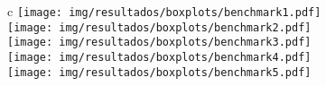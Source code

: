\begin{longfigure}{c}
	\texttt{[image: img/resultados/boxplots/benchmark1.pdf]}\\
	\texttt{[image: img/resultados/boxplots/benchmark2.pdf]}\\
	\texttt{[image: img/resultados/boxplots/benchmark3.pdf]}\\
	\texttt{[image: img/resultados/boxplots/benchmark4.pdf]}\\
	\texttt{[image: img/resultados/boxplots/benchmark5.pdf]}\\
	\caption{}
\end{longfigure}

